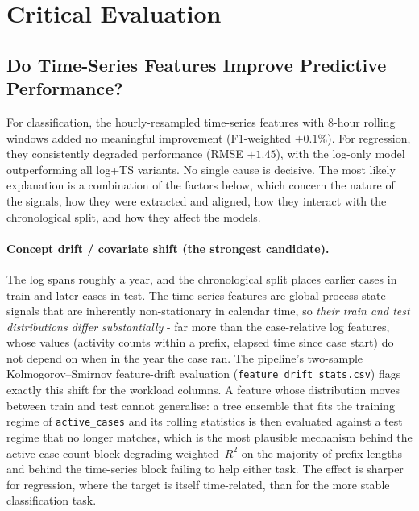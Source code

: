 \documentclass[runningheads]{llncs}
\begin{document}
\section{Critical Evaluation}
\label{sec:evaluation}

\subsection{Do Time-Series Features Improve Predictive Performance?}
\label{sec:discussion-value}

For classification, the hourly-resampled time-series features with 8-hour
rolling windows added no meaningful improvement (F1-weighted $+0.1\%$). For
regression, they consistently degraded performance (RMSE $+1.45$), with the
log-only model outperforming all log+TS variants. No single cause is decisive.
The most likely explanation is a combination of the factors below, which
concern the nature of the signals, how they were extracted and aligned, how
they interact with the chronological split, and how they affect the models.

\paragraph{Concept drift / covariate shift (the strongest candidate).}
The log spans roughly a year, and the chronological split places earlier cases
in train and later cases in test. The time-series features are global
process-state signals that are inherently non-stationary in calendar time, so
\emph{their train and test distributions differ substantially} - far more
than the case-relative log features, whose values (activity counts within a
prefix, elapsed time since case start) do not depend on when in the year the
case ran. The pipeline's two-sample Kolmogorov--Smirnov feature-drift
evaluation (\texttt{feature\_drift\_stats.csv}) flags exactly this shift for the
workload columns. A feature whose distribution moves between train and test
cannot generalise: a tree ensemble that fits the training regime of
\texttt{active\_cases} and its rolling statistics is then evaluated against a
test regime that no longer matches, which is the most plausible mechanism
behind the active-case-count block degrading weighted~$R^2$ on the majority of
prefix lengths and behind the time-series block failing to help either task.
The effect is sharper for regression, where the target is itself time-related,
than for the more stable classification task.
\end{document}
